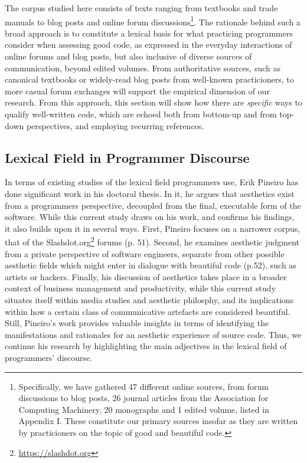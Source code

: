 The corpus studied here consists of texts ranging from textbooks and trade manuals to blog posts and online forum discussions\footnote{Specifically, we have gathered 47 different online sources, from forum discussions to blog posts, 26 journal articles from the Association for Computing Machinery, 20 monographs and 1 edited volume, listed in Appendix I. These constitute our primary sources insofar as they are written by practicioners on the topic of good and beautiful code.}. The rationale behind such a broad approach is to constitute a lexical basis for what practicing programmers consider when assessing good code, as expressed in the everyday interactions of online forums and blog posts, but also inclusive of diverse sources of communication, beyond edited volumes. From authoritative sources, such as canonical textbooks or widely-read blog posts from well-known practicioners, to more casual forum exchanges will support the empirical dimension of our research. From this approach, this section will show how there are \emph{specific} ways to qualify well-written code, which are echoed both from bottom-up and from top-down perspectives, and employing recurring references.

\subsection{Lexical Field in Programmer Discourse}
\label{subsec:lexical-fields}

In terms of existing studies of the lexical field programmers use, Erik Pineiro has done significant work in his doctoral thesis. In it, he argues that aesthetics exist from a programmers perspective, decoupled from the final, executable form of the software. While this current study draws on his work, and confirms his findings, it also builds upon it in several ways. First, Pineiro focuses on a narrower corpus, that of the Slashdot.org\footnote{\url{https://slashdot.org}} forums \citep{pineiro_aesthetics_2003} (p. 51). Second, he examines aesthetic judgment from a private perspective of software engineers, separate from other possible aesthetic fields which might enter in dialogue with beautiful code \citep{pineiro_aesthetics_2003} (p.52), such as artists or hackers. Finally, his discussion of aesthetics takes place in a broader context of business management and productivity, while this current study situates itself within media studies and aesthetic philosphy, and its implications within how a certain class of communicative artefacts are considered beautiful. Still, Pineiro's work provides valuable insights in terms of identifying the manifestations and rationales for an aesthetic experience of source code. Thus, we continue his research by highlighting the main adjectives in the lexical field of programmers' discourse.

